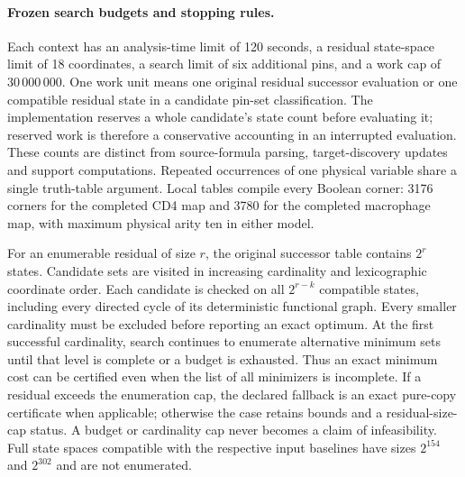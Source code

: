 \paragraph{Frozen search budgets and stopping rules.}
Each context has an analysis-time limit of 120 seconds, a residual
state-space limit of 18 coordinates, a search limit of six additional
pins, and a work cap of $30\,000\,000$. One work unit means one original
residual successor evaluation or one compatible residual state in a
candidate pin-set classification. The implementation reserves a whole
candidate's state count before evaluating it; reserved work is therefore
a conservative accounting in an interrupted evaluation. These counts
are distinct from source-formula parsing, target-discovery updates and
support computations. Repeated occurrences of one physical variable
share a single truth-table argument. Local tables compile every Boolean
corner: 3176 corners for the completed CD4
map and 3780 for the completed macrophage map, with maximum physical
arity ten in either model.

For an enumerable residual of size $r$, the original successor table
contains $2^r$ states. Candidate sets are visited in increasing
cardinality and lexicographic coordinate order. Each candidate is checked
on all $2^{r-k}$ compatible states, including every directed cycle of
its deterministic functional graph. Every smaller cardinality must be
excluded before reporting an exact optimum. At the first successful
cardinality, search continues to enumerate alternative minimum sets
until that level is complete or a budget is exhausted. Thus an exact
minimum cost can be certified even when the list of all minimizers is
incomplete. If a residual exceeds the enumeration cap, the declared
fallback is an exact pure-copy certificate when applicable; otherwise
the case retains bounds and a residual-size-cap status. A budget or
cardinality cap never becomes a claim of infeasibility. Full state
spaces compatible with the respective input baselines have sizes
$2^{154}$ and $2^{302}$ and are not enumerated.

